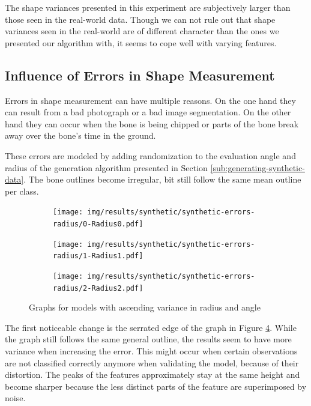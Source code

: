 \documentclass[pdftex,12pt,a4paper]{report}
\begin{document}
The shape variances presented in this experiment are subjectively larger than those seen in the real-world data. Though we can not rule out that shape variances seen in the real-world are of different character than the ones we presented our algorithm with, it seems to cope well with varying features.

\subsection{Influence of Errors in Shape Measurement}

Errors in shape measurement can have multiple reasons. On the one hand they can result from a bad photograph or a bad image segmentation. On the other hand they can occur when the bone is being chipped or parts of the bone break away over the bone's time in the ground.

These errors are modeled by adding randomization to the evaluation angle and radius of the generation algorithm presented in Section \ref{sub:generating-synthetic-data}. The bone outlines become irregular, bit still follow the same mean outline per class.  

\begin{figure}[h]
	\centering
	\begin{subfigure}[b]{0.32\textwidth}
		\centering
		\texttt{[image: img/results/synthetic/synthetic-errors-radius/0-Radius0.pdf]}
		\label{}
	\end{subfigure}
	\begin{subfigure}[b]{0.32\textwidth}
		\centering
		\texttt{[image: img/results/synthetic/synthetic-errors-radius/1-Radius1.pdf]}
		\label{}
	\end{subfigure}
	\begin{subfigure}[b]{0.32\textwidth}
		\centering
		\texttt{[image: img/results/synthetic/synthetic-errors-radius/2-Radius2.pdf]}
		\label{fig:ascending-radius-angle-2}
	\end{subfigure}
	\caption{Graphs for models with ascending variance in radius and angle}
	\label{fig:ascending-radius-angle}
\end{figure}

The first noticeable change is the serrated edge of the graph in Figure \ref{fig:ascending-radius-angle}. While the graph still follows the same general outline, the results seem to have more variance when increasing the error. This might occur when certain observations are not classified correctly anymore when validating the model, because of their distortion. The peaks of the features approximately stay at the same height and become sharper because the less distinct parts of the feature are superimposed by noise.
\end{document}
